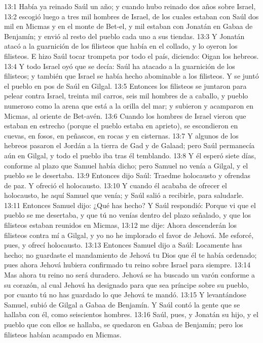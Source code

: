 13:1 Había ya reinado Saúl un año; y cuando hubo reinado dos años sobre Israel,  
13:2 escogió luego a tres mil hombres de Israel, de los cuales estaban con Saúl dos mil en Micmas y en el monte de Bet-el, y mil estaban con Jonatán en Gabaa de Benjamín; y envió al resto del pueblo cada uno a sus tiendas.  
13:3 Y Jonatán atacó a la guarnición de los filisteos que había en el collado, y lo oyeron los filisteos. E hizo Saúl tocar trompeta por todo el país, diciendo: Oigan los hebreos.  
13:4 Y todo Israel oyó que se decía: Saúl ha atacado a la guarnición de los filisteos; y también que Israel se había hecho abominable a los filisteos. Y se juntó el pueblo en pos de Saúl en Gilgal.  
13:5 Entonces los filisteos se juntaron para pelear contra Israel, treinta mil carros, seis mil hombres de a caballo, y pueblo numeroso como la arena que está a la orilla del mar; y subieron y acamparon en Micmas, al oriente de Bet-avén.  
13:6 Cuando los hombres de Israel vieron que estaban en estrecho (porque el pueblo estaba en aprieto), se escondieron en cuevas, en fosos, en peñascos, en rocas y en cisternas.  
13:7 Y algunos de los hebreos pasaron el Jordán a la tierra de Gad y de Galaad; pero Saúl permanecía aún en Gilgal, y todo el pueblo iba tras él temblando.  
13:8 Y él esperó siete días, conforme al plazo que Samuel había dicho; pero Samuel no venía a Gilgal, y el pueblo se le desertaba.  
13:9 Entonces dijo Saúl: Traedme holocausto y ofrendas de paz. Y ofreció el holocausto.  
13:10 Y cuando él acababa de ofrecer el holocausto, he aquí Samuel que venía; y Saúl salió a recibirle, para saludarle.  
13:11 Entonces Samuel dijo: ¿Qué has hecho? Y Saúl respondió: Porque vi que el pueblo se me desertaba, y que tú no venías dentro del plazo señalado, y que los filisteos estaban reunidos en Micmas,  
13:12 me dije: Ahora descenderán los filisteos contra mí a Gilgal, y yo no he implorado el favor de Jehová. Me esforcé, pues, y ofrecí holocausto.  
13:13 Entonces Samuel dijo a Saúl: Locamente has hecho; no guardaste el mandamiento de Jehová tu Dios que él te había ordenado; pues ahora Jehová hubiera confirmado tu reino sobre Israel para siempre.  
13:14 Mas ahora tu reino no será duradero. Jehová se ha buscado un varón conforme a su corazón, al cual Jehová ha designado para que sea príncipe sobre su pueblo, por cuanto tú no has guardado lo que Jehová te mandó.  
13:15 Y levantándose Samuel, subió de Gilgal a Gabaa de Benjamín. Y Saúl contó la gente que se hallaba con él, como seiscientos hombres.  
13:16 Saúl, pues, y Jonatán su hijo, y el pueblo que con ellos se hallaba, se quedaron en Gabaa de Benjamín; pero los filisteos habían acampado en Micmas.  
